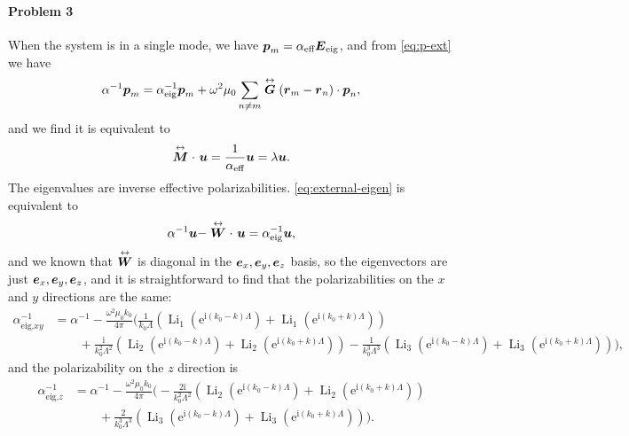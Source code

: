 \documentclass[hyperref, a4paper]{article}
\newcommand*{\ii}{\mathrm{i}}
\newcommand*{\ee}{\mathrm{e}}
\DeclareMathOperator{\li}{Li}
\renewcommand{\tensor}[1]{ \stackrel{\leftrightarrow}{\vb*{#1}}}
\begin{document}
\paragraph{Problem 3} When the system is in a single mode, we have $\vb*{p}_m = \alpha_\text{eff} 
\vb*{E}_\text{eig}$, and from \eqref{eq:p-ext} we have 
\[
    \alpha^{-1} \vb*{p}_m = \alpha_\text{eig}^{-1} \vb*{p}_m + \omega^2 \mu_0 \sum_{n \neq m} \tensor{\vb*{G}}(\vb*{r}_m - \vb*{r}_n) \cdot \vb*{p}_n,
\]
and we find it is equivalent to 
\begin{equation}
    \tensor{\vb*{M}} \cdot \ \vb*{u} = \frac{1}{\alpha_\text{eff}} \vb*{u} = \lambda \vb*{u}.
    \label{eq:external-eigen}
\end{equation}
The eigenvalues are inverse effective polarizabilities. \eqref{eq:external-eigen} is equivalent to 
\[
    \alpha^{-1} \vb*{u} - \tensor{\vb*{W}} \cdot \ \vb*{u} = \alpha_\text{eig}^{-1} \vb*{u},
\]
and we known that $\tensor{\vb*{W}}$ is diagonal in the $\vb*{e}_x, \vb*{e}_y, \vb*{e}_z$ basis, so the
eigenvectors are just $\vb*{e}_x, \vb*{e}_y, \vb*{e}_z$, and it is straightforward to find that the 
polarizabilities on the $x$ and $y$ directions are the same: 
\begin{equation}
    \begin{aligned}
        \alpha_\text{eig,$xy$}^{-1} &= \alpha^{-1} - \frac{\omega^2 \mu_0 k_0}{4 \pi} \biggl( \frac{1}{k_0 \Lambda} (\li_1(\ee^{\ii (k_0 - k) \Lambda}) + \li_1(\ee^{\ii (k_0 + k) \Lambda})) \\
        &\quad \quad + \frac{\ii}{k_0^2 \Lambda^2} (\li_2(\ee^{\ii (k_0 - k) \Lambda}) + \li_2(\ee^{\ii (k_0 + k) \Lambda})) - \frac{1}{k_0^3 \Lambda^3} (\li_3(\ee^{\ii (k_0 - k) \Lambda}) + \li_3(\ee^{\ii (k_0 + k) \Lambda})) \biggr),
    \end{aligned}
\end{equation}
and the polarizability on the $z$ direction is 
\begin{equation}
    \begin{aligned}
        \alpha_\text{eig,$z$}^{-1} &= \alpha^{-1} - \frac{\omega^2 \mu_0 k_0}{4 \pi} \biggl( - \frac{2\ii}{k_0^2 \Lambda^2} (\li_2(\ee^{\ii (k_0 - k) \Lambda}) + \li_2(\ee^{\ii (k_0 + k) \Lambda})) \\
        &\quad \quad  + \frac{2}{k_0^3 \Lambda^3} (\li_3(\ee^{\ii (k_0 - k) \Lambda}) + \li_3(\ee^{\ii (k_0 + k) \Lambda})) \biggr).
    \end{aligned}
\end{equation}
\end{document}
